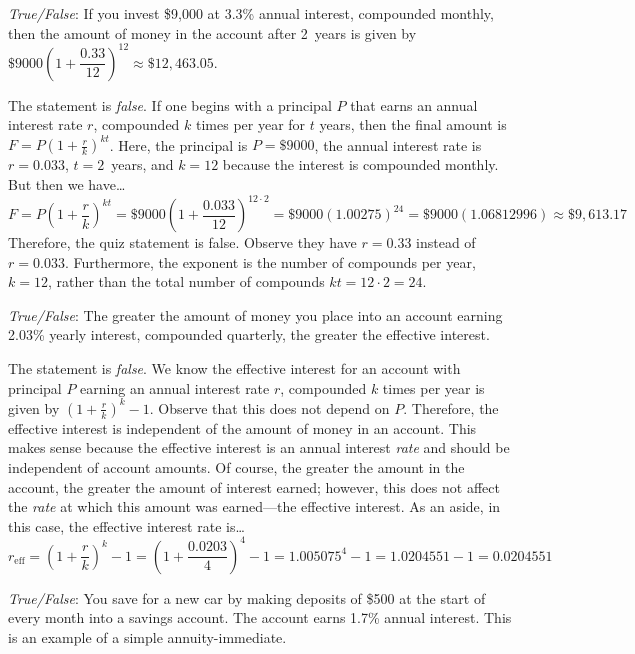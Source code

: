 \documentclass[11pt,letterpaper]{article}
\begin{document}
\quizsol \textit{True/False}: If you invest \$9,000 at 3.3\% annual interest, compounded monthly, then the amount of money in the account after 2~years is given by $\$9000 \left(1 + \dfrac{0.33}{12} \right)^{12} \approx \$12,463.05$. \pspace

\sol The statement is \textit{false}. If one begins with a principal $P$ that earns an annual interest rate $r$, compounded $k$ times per year for $t$ years, then the final amount is $F= P \left(1 + \frac{r}{k} \right)^{kt}$. Here, the principal is $P= \$9000$, the annual interest rate is $r= 0.033$, $t= 2$~years, and $k= 12$ because the interest is compounded monthly. But then we have\dots
	\[
	F= P \left(1 + \frac{r}{k} \right)^{kt}= \$9000 \left(1 + \dfrac{0.033}{12} \right)^{12 \cdot 2}= \$9000 (1.00275)^{24}= \$9000 (1.06812996) \approx \$9,\!613.17
	\]
Therefore, the quiz statement is false. Observe they have $r= 0.33$ instead of $r= 0.033$. Furthermore, the exponent is the number of compounds per year, $k= 12$, rather than the total number of compounds $kt= 12 \cdot 2= 24$. \pvspace{1.1cm}



\quizsol \textit{True/False}: The greater the amount of money you place into an account earning 2.03\% yearly interest, compounded quarterly, the greater the effective interest. \pspace

\sol The statement is \textit{false}. We know the effective interest for an account with principal $P$ earning an annual interest rate $r$, compounded $k$ times per year is given by $\left(1 + \frac{r}{k} \right)^k - 1$. Observe that this does not depend on $P$. Therefore, the effective interest is independent of the amount of money in an account. This makes sense because the effective interest is an annual interest \textit{rate} and should be independent of account amounts. Of course, the greater the amount in the account, the greater the amount of interest earned; however, this does not affect the \textit{rate} at which this amount was earned---the effective interest. As an aside, in this case, the effective interest rate is\dots
	\[
	r_{\text{eff}}= \left(1 + \dfrac{r}{k} \right)^k - 1= \left(1 + \dfrac{0.0203}{4} \right)^4 - 1= 1.005075^4 - 1= 1.0204551 - 1= 0.0204551
	\] \pvspace{1cm}



\quizsol \textit{True/False}: You save for a new car by making deposits of \$500 at the start of every month into a savings account. The account earns 1.7\% annual interest. This is an example of a simple annuity-immediate. \pspace
\end{document}
